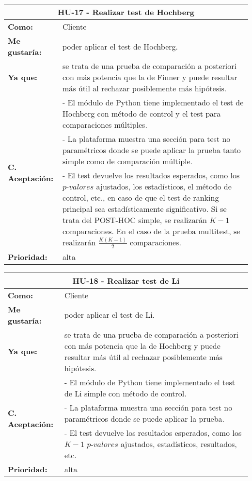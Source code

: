 \begin{table}[H]
	\begin{tabular}{| p{3cm}| p{11cm} |}
		\hline
		\multicolumn{2}{|c|}{\textbf{HU-17} - Realizar test de Hochberg} \\ \hline
		\textbf{Como:} & Cliente \\ \hline
		\textbf{Me gustaría:} & poder aplicar el test de Hochberg. \\ \hline
		\textbf{Ya que:} & se trata de una prueba de comparación a posteriori con más potencia que la de Finner y puede resultar más útil al rechazar posiblemente más hipótesis. \\ \hline
		\multirow{3}{11cm}{\textbf{C. Aceptación:}} & - El módulo de Python tiene implementado el test de Hochberg con método de control y el test para comparaciones múltiples. \\
		& - La plataforma muestra una sección para test no paramétricos donde se puede aplicar la prueba tanto simple como de comparación múltiple. \\
		& - El test devuelve los resultados esperados, como los $\textit{p-valores}$ ajustados, los estadísticos, el método de control, etc., en caso de que el test de ranking principal sea estadísticamente significativo. Si se trata del POST-HOC simple, se realizarán $K-1$ comparaciones. En el caso de la prueba multitest, se realizarán $\frac{K(K-1)}{2}$ comparaciones. \\ \hline
		\textbf{\textbf{Prioridad:}} & alta \\ \hline
	\end{tabular}
\end{table}


\begin{table}[H]
	\begin{tabular}{| p{3cm}| p{11cm} |}
		\hline
		\multicolumn{2}{|c|}{\textbf{HU-18} - Realizar test de Li} \\ \hline
		\textbf{Como:} & Cliente \\ \hline
		\textbf{Me gustaría:} & poder aplicar el test de Li. \\ \hline
		\textbf{Ya que:} & se trata de una prueba de comparación a posteriori con más potencia que la de Hochberg y puede resultar más útil al rechazar posiblemente más hipótesis. \\ \hline
		\multirow{3}{11cm}{\textbf{C. Aceptación:}} & - El módulo de Python tiene implementado el test de Li simple con método de control. \\
		& - La plataforma muestra una sección para test no paramétricos donde se puede aplicar la prueba. \\
		& - El test devuelve los resultados esperados, como los $K-1$ $\textit{p-valores}$ ajustados, estadísticos, resultados, etc. \\ \hline
		\textbf{\textbf{Prioridad:}} & alta \\ \hline
	\end{tabular}
\end{table}

